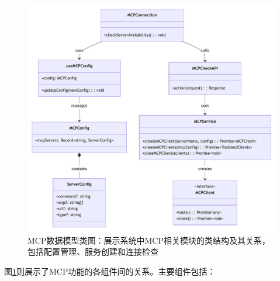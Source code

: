 \begin{figure}
  \centering
  \includegraphics[width=\textwidth]{figures/mcp_class.pdf}
  \caption{MCP数据模型类图：展示系统中MCP相关模块的类结构及其关系，包括配置管理、服务创建和连接检查}
  \label{fig:mcp_class}
\end{figure}

图\ref{fig:mcp_class}则展示了MCP功能的各组件间的关系。主要组件包括：

